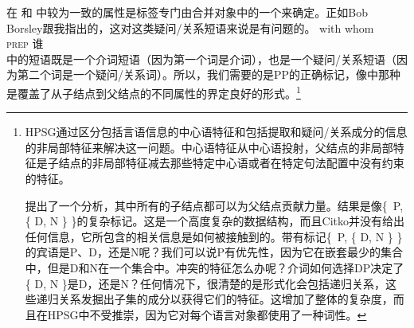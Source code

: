 在 和 中较为一致的属性是标签专门由合并对象中的一个来确定。正如Bob Borsley跟我指出的，这对这类疑问/关系短语来说是有问题的。
\ea
\gll with whom\\
\textsc{prep} 谁\\
\z
{}中的短语既是一个介词短语（因为第一个词是介词），也是一个疑问/关系短语（因为第二个词是一个疑问/关系词）。所以，我们需要的是PP的正确标记，像中那种是覆盖了从子结点到父结点的不同属性的界定良好的形式。\footnote{%
HPSG通过区分包括言语信息的中心语特征和包括提取和疑问/关系成分的信息的非局部特征来解决这一问题。中心语特征从中心语投射，父结点的非局部特征是子结点的非局部特征减去那些特定中心语或者在特定句法配置中没有约束的特征。

 \citet[]{Citko2008a}提出了一个分析，其中所有的子结点都可以为父结点贡献力量。结果是像\{~P, \{ D, N \} \}的复杂标记。这是一个高度复杂的数据结构，而且Citko并没有给出任何信息，它所包含的相关信息是如何被接触到的。带有标记\{~P, \{ D, N \} \}的宾语是P、D，还是N呢？我们可以说P有优先性，因为它在嵌套最少的集合中，但是D和N在一个集合中。冲突的特征怎么办呢？介词如何选择DP决定了\{ D, N \}是D，还是N？任何情况下，很清楚的是形式化会包括递归关系，这些递归关系发掘出子集的成分以获得它们的特征。这增加了整体的复杂度，而且在HPSG中不受推崇，因为它对每个语言对象都使用了一种词性。
}


